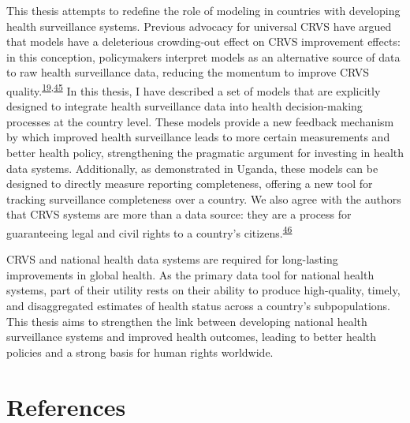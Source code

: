 \documentclass[
]{article}
\begin{document}
This thesis attempts to redefine the role of modeling in countries with developing health surveillance systems. Previous advocacy for universal CRVS have argued that models have a deleterious crowding-out effect on CRVS improvement effects: in this conception, policymakers interpret models as an alternative source of data to raw health surveillance data, reducing the momentum to improve CRVS quality.\textsuperscript{\protect\hyperlink{ref-Setel2007}{19},\protect\hyperlink{ref-Tichenor2020}{45}} In this thesis, I have described a set of models that are explicitly designed to integrate health surveillance data into health decision-making processes at the country level. These models provide a new feedback mechanism by which improved health surveillance leads to more certain measurements and better health policy, strengthening the pragmatic argument for investing in health data systems. Additionally, as demonstrated in Uganda, these models can be designed to directly measure reporting completeness, offering a new tool for tracking surveillance completeness over a country. We also agree with the authors that CRVS systems are more than a data source: they are a process for guaranteeing legal and civil rights to a country's citizens.\textsuperscript{\protect\hyperlink{ref-AbouZahr2015}{46}}

CRVS and national health data systems are required for long-lasting improvements in global health. As the primary data tool for national health systems, part of their utility rests on their ability to produce high-quality, timely, and disaggregated estimates of health status across a country's subpopulations. This thesis aims to strengthen the link between developing national health surveillance systems and improved health outcomes, leading to better health policies and a strong basis for human rights worldwide.

\hypertarget{references}{%
\section{References}\label{references}}
\end{document}
